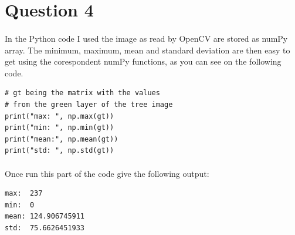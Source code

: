 \documentclass[a4paper,11pt]{article}
\begin{document}
\section{Question 4}
\paragraph{}
In the Python code I used the image as read by OpenCV are stored as numPy array. The minimum, maximum, mean and standard deviation are then easy to get using the corespondent numPy functions, as you can see on the following code.

\begin{lstlisting}
# gt being the matrix with the values
# from the green layer of the tree image
print("max: ", np.max(gt))
print("min: ", np.min(gt))
print("mean:", np.mean(gt))
print("std: ", np.std(gt))
\end{lstlisting}

\paragraph{}
Once run this part of the code give the following output:

\begin{lstlisting}
max:  237
min:  0
mean: 124.906745911
std:  75.6626451933  
\end{lstlisting}
\end{document}
